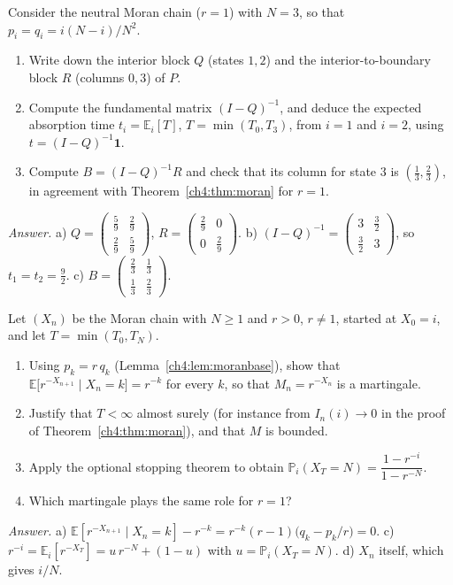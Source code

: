 \begin{exercise}
Consider the neutral Moran chain ($r=1$) with $N=3$, so that $p_i=q_i=i(N-i)/N^2$.
\begin{enumerate}[label=\alph*),itemsep=0pt]
\item Write down the interior block $Q$ (states $1,2$) and the interior-to-boundary block $R$ (columns $0,3$) of $P$.
\item Compute the fundamental matrix $(I-Q)^{-1}$, and deduce the expected absorption time $t_i=\mathbb E_i[T]$,
$T=\min(T_0,T_3)$, from $i=1$ and $i=2$, using $t=(I-Q)^{-1}\mathbf 1$.
\item Compute $B=(I-Q)^{-1}R$ and check that its column for state $3$ is $(\frac13,\frac23)$, in agreement with
Theorem~\ref{ch4:thm:moran} for $r=1$.
\end{enumerate}
\emph{Answer.} a) $Q=\begin{pmatrix}\frac59&\frac29\\[1pt]\frac29&\frac59\end{pmatrix}$,
$R=\begin{pmatrix}\frac29&0\\[1pt]0&\frac29\end{pmatrix}$. b) $(I-Q)^{-1}=\begin{pmatrix}3&\frac32\\[1pt]\frac32&3\end{pmatrix}$,
so $t_1=t_2=\frac92$. c) $B=\begin{pmatrix}\frac23&\frac13\\[1pt]\frac13&\frac23\end{pmatrix}$.
\end{exercise}

\begin{exercise}\label{ch4:ex:moranmart}
Let $(X_n)$ be the Moran chain with $N\ge1$ and $r>0$, $r\ne1$, started at $X_0=i$, and let $T=\min(T_0,T_N)$.
\begin{enumerate}[label=\alph*),itemsep=0pt]
\item Using $p_k=r\,q_k$ (Lemma~\ref{ch4:lem:moranbase}), show that
$\mathbb E\bigl[r^{-X_{n+1}}\mid X_n=k\bigr]=r^{-k}$ for every $k$, so that $M_n=r^{-X_n}$ is a martingale.
\item Justify that $T<\infty$ almost surely (for instance from $I_n(i)\to0$ in the proof of
Theorem~\ref{ch4:thm:moran}), and that $M$ is bounded.
\item Apply the optional stopping theorem to obtain $\mathbb P_i(X_T=N)=\dfrac{1-r^{-i}}{1-r^{-N}}$.
\item Which martingale plays the same role for $r=1$?
\end{enumerate}
\emph{Answer.} a) $\mathbb E[r^{-X_{n+1}}\mid X_n=k]-r^{-k}=r^{-k}(r-1)\bigl(q_k-p_k/r\bigr)=0$.
c) $r^{-i}=\mathbb E_i[r^{-X_T}]=u\,r^{-N}+(1-u)$ with $u=\mathbb P_i(X_T=N)$. d) $X_n$ itself, which gives $i/N$.
\end{exercise}

\label{ch4:fin}
\fussy
